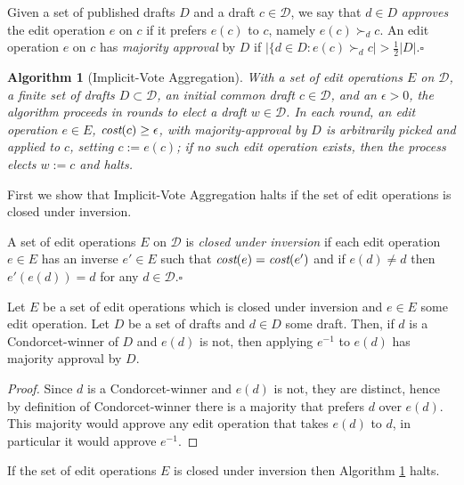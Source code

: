 \documentclass[sigconf]{aamas}  %
\newtheorem{algorithm}{Algorithm}
\newcommand{\qqed}{\hfill$\square$}
\newcommand{\calD}{\mathcal{D}}
\newcommand{\prefers}[1]{\succ_{#1}}
\newcommand{\cost}{\emph{cost}}
\begin{document}
\begin{definition}
%
Given a set of published drafts $D$ and a draft $c \in \calD$,  we say that $d \in D$ \emph{approves} the edit operation $e$ on $c$ if it prefers $e(c)$ to $c$, namely $e(c) \prefers{d} c$.  An edit operation $e$ on $c$ has \emph{majority approval} by $D$ if $|\{d \in D : e(c) \prefers{d} c| > \frac{1}{2}{|D|}$.\qqed 
%
\end{definition}

\begin{algorithm}[Implicit-Vote Aggregation]\label{algorithm:iva}
With a set of edit operations $E$ on $\calD$, a finite set of drafts $D \subset \calD$, an initial common draft $c \in \calD$,  and an $\epsilon > 0$, the algorithm proceeds in rounds to elect a draft $w \in \calD$.   In each round, an edit operation $e \in E$, $\cost(c) \ge \epsilon$,  with majority-approval by $D$ is arbitrarily picked and applied to $c$, setting $c := e(c)$;
if no such edit operation exists, then the process elects $w:=c$ and halts.
\end{algorithm}

First we show that Implicit-Vote Aggregation halts if the set of edit operations is closed under inversion.

\begin{definition}
%
A set of edit operations $E$ on $\calD$ is \emph{closed under inversion} if each edit operation $e \in E$ has an inverse $e' \in E$ such that $\cost(e)=\cost(e')$ and if $e(d) \ne d$ then $e'(e(d)) = d$ for any  $d \in \calD$.\qqed
%
\end{definition}


\begin{lemma}\label{lemma:inverse}
Let $E$ be a set of edit operations which is closed under inversion and $e \in E$ some edit operation.
Let $D$ be a set of drafts and 
$d \in D$ some draft.
Then,
if $d$ is a Condorcet-winner of $D$ and $e(d)$ is not,
then applying $e^{-1}$ to $e(d)$ has majority approval by $D$.
\end{lemma}

\begin{proof}
%
Since $d$ is a Condorcet-winner and $e(d)$ is not, they are distinct, hence by definition of Condorcet-winner there is a majority that prefers $d$ over $e(d)$.  This majority would approve any edit operation that takes $e(d)$ to $d$, in particular it would approve $e^{-1}$.
%
\end{proof}

\begin{lemma}\label{lemma:stops}
If the set of edit operations $E$ is closed under inversion then Algorithm \ref{algorithm:iva} halts.
\end{lemma}
\end{document}
